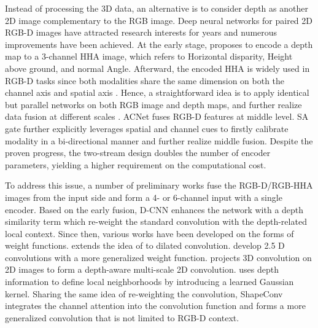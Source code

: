 \documentclass[lettersize,journal]{IEEEtran}
\begin{document}
Instead of processing the 3D data, an alternative is to consider depth as another 2D image complementary to the RGB image. Deep neural networks for paired 2D RGB-D images have attracted research interests for years and numerous improvements have been achieved. At the early stage, \cite{gupta2014learning} proposes to encode a depth map to a 3-channel HHA image, which refers to Horizontal disparity, Height above ground, and normal Angle.   Afterward, the encoded HHA is widely used in RGB-D tasks since both modalities share the same dimension on both the channel axis and spatial axis \cite{hu2019acnet,Long2015FCN,xiong2020variational}. Hence, a straightforward idea is to apply identical but parallel networks on both RGB image and depth maps, and further realize data fusion at different scales  \cite{Lin2017RGBDCascaded,wang2016RGBD}. ACNet \cite{hu2019acnet} fuses RGB-D features at middle level. SA gate \cite{chen2020bi} further explicitly leverages spatial and channel cues to firstly calibrate modality in a bi-directional manner and further realize middle fusion. Despite the proven progress, the two-stream design doubles the number of encoder parameters, yielding a higher requirement on the computational cost.

To address this issue, a number of preliminary works \cite{gupta2014learning,hazirbas2016fusenet,wang2016learning} fuse the RGB-D/RGB-HHA images from the input side and form a 4- or 6-channel input with a single encoder. Based on the early fusion, D-CNN \cite{Wang2018DCNN} enhances the network with a depth similarity term which re-weight the standard convolution with the depth-related local context. Since then, various works have been developed on the forms of weight functions. \cite{chen20193d} extends the idea of \cite{Wang2018DCNN} to dilated convolution. \cite{xing20192,xing2020malleable} develop 2.5 D convolutions with a more generalized weight function. \cite{chu2018surfconv} projects 3D convolution on 2D images to form a depth-aware multi-scale 2D convolution. \cite{xiong2020variational} uses depth information to define local neighborhoods by introducing a learned Gaussian kernel. Sharing the same idea of re-weighting the convolution, ShapeConv \cite{cao2021shapeconv} integrates the channel attention into the convolution function and forms a more generalized convolution that is not limited to RGB-D context.
\end{document}

